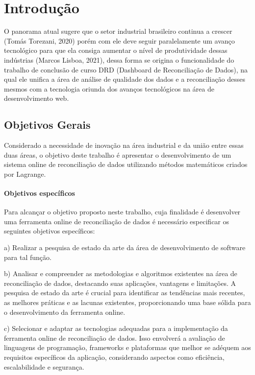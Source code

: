 \chapter[Introdução]{Introdução}
O panorama atual sugere que o setor industrial brasileiro continua a crescer (Tomás Torezani, 2020) porém com ele deve seguir paralelamente um avanço tecnológico para que ela consiga aumentar o nível de produtividade dessas indústrias (Marcos Lisboa, 2021), dessa forma se origina o funcionalidade do trabalho de conclusão de curso DRD (Dashboard de Reconciliação de Dados), na qual ele unifica a área de análise de qualidade dos dados e a reconciliação desses mesmos com a tecnologia oriunda dos avanços tecnológicos na área de desenvolvimento web.

\section{Objetivos Gerais}

Considerado a necessidade de inovação na área industrial e da união entre essas duas áreas, o objetivo deste trabalho é apresentar o desenvolvimento de um sistema online de reconciliação de dados utilizando métodos matemáticos criados por Lagrange.

\subsubsection{Objetivos específicos}

Para alcançar o objetivo proposto neste trabalho, cuja finalidade é desenvolver uma ferramenta online de reconciliação de dados é necessário especificar os seguintes objetivos específicos:

a) Realizar a pesquisa de estado da arte da área de desenvolvimento de software para tal função.

b) Analisar e compreender as metodologias e algoritmos existentes na área de reconciliação de dados, destacando suas aplicações, vantagens e limitações. A pesquisa de estado da arte é crucial para identificar as tendências mais recentes, as melhores práticas e as lacunas existentes, proporcionando uma base sólida para o desenvolvimento da ferramenta online.

c) Selecionar e adaptar as tecnologias adequadas para a implementação da ferramenta online de reconciliação de dados. Isso envolverá a avaliação de linguagens de programação, frameworks e plataformas que melhor se adéquem aos requisitos específicos da aplicação, considerando aspectos como eficiência, escalabilidade e segurança.

